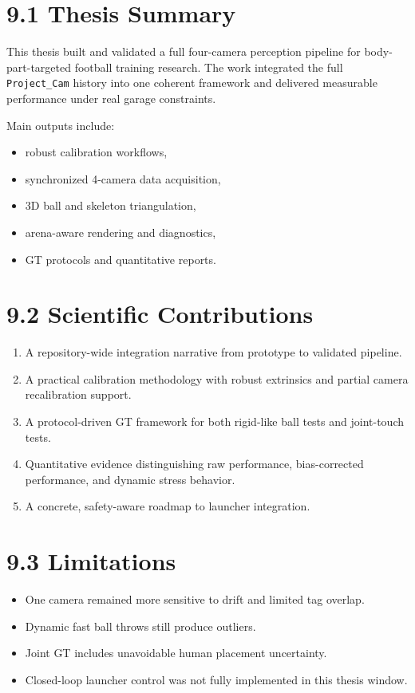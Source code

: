 \section{9.1 Thesis Summary}
This thesis built and validated a full four-camera perception pipeline for body-part-targeted football training research. The work integrated the full \texttt{Project\_Cam} history into one coherent framework and delivered measurable performance under real garage constraints.

Main outputs include:
\begin{itemize}
  \item robust calibration workflows,
  \item synchronized 4-camera data acquisition,
  \item 3D ball and skeleton triangulation,
  \item arena-aware rendering and diagnostics,
  \item GT protocols and quantitative reports.
\end{itemize}

\section{9.2 Scientific Contributions}
\begin{enumerate}
  \item A repository-wide integration narrative from prototype to validated pipeline.
  \item A practical calibration methodology with robust extrinsics and partial camera recalibration support.
  \item A protocol-driven GT framework for both rigid-like ball tests and joint-touch tests.
  \item Quantitative evidence distinguishing raw performance, bias-corrected performance, and dynamic stress behavior.
  \item A concrete, safety-aware roadmap to launcher integration.
\end{enumerate}

\section{9.3 Limitations}
\begin{itemize}
  \item One camera remained more sensitive to drift and limited tag overlap.
  \item Dynamic fast ball throws still produce outliers.
  \item Joint GT includes unavoidable human placement uncertainty.
  \item Closed-loop launcher control was not fully implemented in this thesis window.
\end{itemize}

